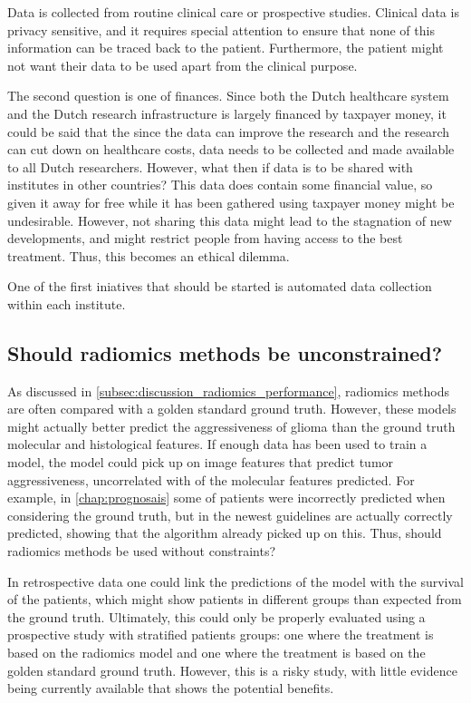 Data is collected from routine clinical care or prospective studies.
Clinical data is privacy sensitive, and it requires special attention to ensure that none of this information can be traced back to the patient.
Furthermore, the patient might not want their data to be used apart from the clinical purpose.

The second question is one of finances.
Since both the Dutch healthcare system and the Dutch research infrastructure is largely financed by taxpayer money, it could be said that the since the data can improve the research and the research can cut down on healthcare costs, data needs to be collected and made available to all Dutch researchers.
However, what then if data is to be shared with institutes in other countries?
This data does contain some financial value, so given it away for free while it has been gathered using taxpayer money might be undesirable.
However, not sharing this data might lead to the stagnation of new developments, and might restrict people from having access to the best treatment.
Thus, this becomes an ethical dilemma.

One of the first iniatives that should be started is automated data collection within each institute.


\subsection{Should radiomics methods be unconstrained?}

As discussed in \cref{subsec:discussion_radiomics_performance}, radiomics methods are often compared with a golden standard ground truth.
However, these models might actually better predict the aggressiveness of \gls{glioma} than the ground truth molecular and histological features.
If enough data has been used to train a model, the model could pick up on image features that predict \gls{tumor} aggressiveness, uncorrelated with of the molecular features predicted.
For example, in \cref{chap:prognosais} some of patients were incorrectly predicted when considering the ground truth, but in the newest guidelines are actually correctly predicted, showing that the algorithm already picked up on this.
Thus, should radiomics methods be used without constraints?

In retrospective data one could link the predictions of the model with the survival of the patients, which might show patients in different groups than expected from the ground truth.
Ultimately, this could only be properly evaluated using a prospective study with stratified patients groups: one where the treatment is based on the radiomics model and one where the treatment is based on the golden standard ground truth.
However, this is a risky study, with little evidence being currently available that shows the potential benefits.

